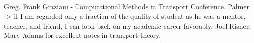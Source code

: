 
\begin{center}
\section*{}
\label{sec:ack}
\end{center}

\thispagestyle{empty}

\noindent
   \indent Greg.  Frank Graziani - Computational Methods in Transport Conference.  Palmer -> if I am
   regarded only a fraction of the quality of student as he was a mentor, teacher, and friend, I can 
   look back on my academic career favorably.  Joel Risner.  Marv Adams for excellent notes in 
   transport theory.
     
\thispagestyle{empty}
